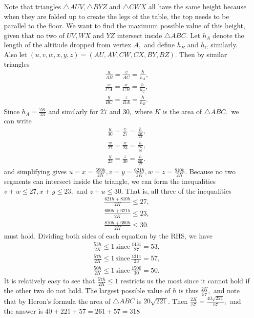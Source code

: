 \begin{enumerate}
Note that triangles $\triangle AUV, \triangle BYZ$ and $\triangle CWX$ all have the same height because when they are folded up to create the legs of the table, the top needs to be parallel to the floor. We want to find the maximum possible value of this height, given that no two of $\overline{UV}, \overline{WX}$ and $\overline{YZ}$ intersect inside $\triangle ABC$. Let $h_{A}$ denote the length of the altitude dropped from vertex $A,$ and define $h_{B}$ and $h_{C}$ similarly. Also let $(u, v, w, x, y, z) = (AU, AV, CW, CX, BY, BZ)$. Then by similar triangles
 \begin{align} \frac{u}{AB}=\frac{v}{AC}=\frac{h}{h_{A}}, \\ \frac{w}{CA}=\frac{x}{CB}=\frac{h}{h_{C}}, \\ \frac{y}{BC}=\frac{z}{BA}=\frac{h}{h_{B}}. \end{align}Since $h_{A}=\frac{2K}{23}$ and similarly for $27$ and $30,$ where $K$ is the area of $\triangle ABC,$ we can write
 \begin{align} \frac{u}{30}=\frac{v}{27}=\frac{h}{\frac{2K}{23}}, \\ \frac{w}{27}=\frac{x}{23}=\frac{h}{\frac{2K}{30}}, \\ \frac{y}{23}=\frac{z}{30}=\frac{h}{\frac{2K}{27}}. \end{align}and simplifying gives $u=x=\frac{690h}{2K}, v=y=\frac{621h}{2K}, w=z=\frac{810h}{2K}$. Because no two segments can intersect inside the triangle, we can form the inequalities $v+w\leq 27, x+y\leq 23,$ and $z+u\leq 30$. That is, all three of the inequalities
 \begin{align} \frac{621h+810h}{2K}\leq 27, \\ \frac{690h+621h}{2K}\leq 23, \\ \frac{810h+690h}{2K}\leq 30. \end{align}must hold. Dividing both sides of each equation by the RHS, we have
 \begin{align} \frac{53h}{2K}\leq 1\, \text{since}\, \frac{1431}{27}=53, \\ \frac{57h}{2K}\leq 1\, \text{since}\, \frac{1311}{23}=57, \\ \frac{50h}{2K}\leq 1\, \text{since}\, \frac{1500}{30}=50. \end{align}It is relatively easy to see that $\frac{57h}{2K}\leq 1$ restricts us the most since it cannot hold if the other two do not hold. The largest possible value of $h$ is thus $\frac{2K}{57},$ and note that by Heron's formula the area of $\triangle ABC$ is $20\sqrt{221}$. Then $\frac{2K}{57}=\frac{40\sqrt{221}}{57},$ and the answer is $40+221+57=261+57=\boxed{318}$





\end{enumerate}
